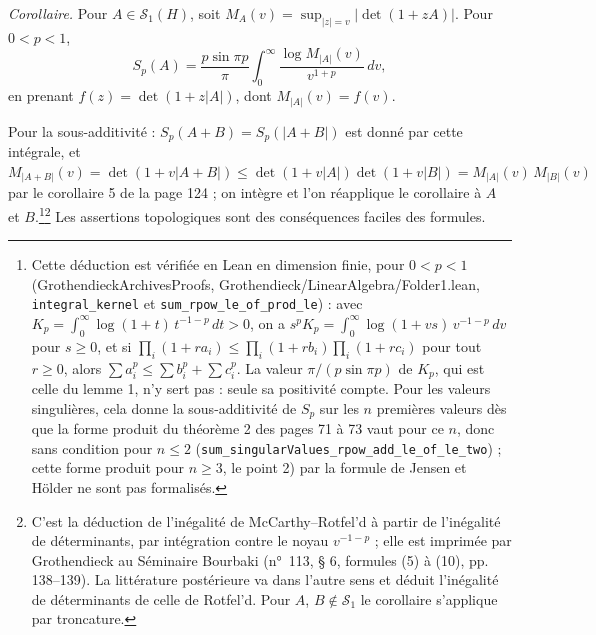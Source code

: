 \documentclass[11pt,a4paper]{article}
\begin{document}
\emph{Corollaire.} Pour $A \in \mathcal{S}_1(H)$, soit $M_A(v) = \sup_{|z| =
v} |\det(1 + zA)|$. Pour $0 < p < 1$,
\[
  S_p(A) = \frac{p\sin\pi p}{\pi}\int_0^\infty \frac{\log M_{|A|}(v)}{v^{1+p}}\,dv,
\]
en prenant $f(z) = \det(1 + z|A|)$, dont $M_{|A|}(v) = f(v)$.

Pour la sous-additivité : $S_p(A + B) = S_p(|A + B|)$ est donné par cette
intégrale, et $M_{|A+B|}(v) = \det(1 + v|A + B|) \leq \det(1 + v|A|)\det(1 +
v|B|) = M_{|A|}(v)\,M_{|B|}(v)$ par le corollaire 5 de la page 124 ; on
intègre et l'on réapplique le corollaire à $A$ et $B$.\footnote{Cette
déduction est vérifiée en Lean en dimension finie, pour $0 < p < 1$
(GrothendieckArchivesProofs, Grothendieck/LinearAlgebra/Folder1.lean, \texttt{integral\_kernel} et
\texttt{sum\_rpow\_le\_of\_prod\_le}) : avec $K_p = \int_0^\infty
\log(1 + t)\,t^{-1-p}\,dt > 0$, on a $s^p K_p = \int_0^\infty \log(1 +
vs)\,v^{-1-p}\,dv$ pour $s \geq 0$, et si $\prod_i(1 + r a_i) \leq \prod_i(1 +
r b_i)\prod_i(1 + r c_i)$ pour tout $r \geq 0$, alors $\sum a_i^p \leq \sum
b_i^p + \sum c_i^p$. La valeur $\pi/(p \sin \pi p)$ de $K_p$, qui est celle du
lemme 1, n'y sert pas : seule sa positivité compte. Pour les valeurs
singulières, cela donne la sous-additivité de $S_p$ sur les $n$ premières
valeurs dès que la forme produit du théorème 2 des pages 71 à 73 vaut pour
ce $n$, donc sans condition pour $n \leq 2$
(\texttt{sum\_singularValues\_rpow\_add\_le\_of\_le\_two}) ; cette forme
produit pour $n \geq 3$, le point 2) par la formule de Jensen et Hölder ne sont pas
formalisés.}\footnote{C'est la déduction de l'inégalité de McCarthy--Rotfel'd à partir de
l'inégalité de déterminants, par intégration contre le noyau $v^{-1-p}$ ; elle
est imprimée par Grothendieck au Séminaire Bourbaki (n°~113, § 6, formules
(5) à (10), pp. 138--139). La littérature postérieure va dans l'autre sens et
déduit l'inégalité de déterminants de celle de Rotfel'd. Pour $A$, $B \notin \mathcal{S}_1$ le
corollaire s'applique par troncature.} Les assertions topologiques sont des
conséquences faciles des formules.
\end{document}
